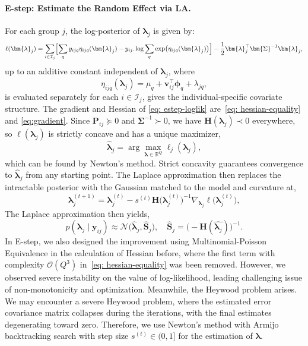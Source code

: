 \paragraph*{E-step: Estimate the Random Effect via LA.}
For each group $j$, the log-posterior of $\bm{\lambda}_{j}$ is given by:
\begin{equation}
    \ell(\bm{\lambda}_{j})=\sum_{i\in \mathcal{I}_{j}}\Bigl[\sum_{q}y_{ijq}\eta_{ijq}(\bm{\lambda}_{j})-y_{ij\cdot}\log \sum_{q}\exp\bigl(\eta_{ijq}(\bm{\lambda}_{j})\bigr)\Bigr]-\frac{1}{2}\bm{\lambda}_{j}^{\top}\bm{\Sigma}^{-1}\bm{\lambda}_{j},
    \label{eq: estep-loglik}
\end{equation}
up to an additive constant independent of $\bm{\lambda}_{j}$, where 
\begin{equation}
    \eta_{ijq}(\bm{\lambda}_{j})=\mu_{q}+\bm{v}_{ij}^{\top}\bm{\phi}_{q}+\lambda_{jq},
    \label{eq: individualcovariate}
\end{equation}
is evaluated separately for each $i\in \mathcal{I}_{j}$, gives the individual-specific covariate structure.
The gradient and Hessian of \eqref{eq: estep-loglik} are~\eqref{eq: hessian-equality} and \eqref{eq:gradient}. Since $\mathbf{P}_{ij}\succeq 0$ and $\bm{\Sigma}^{-1}\succ 0$, we have $\mathbf{H}(\bm{\lambda}_{j})\prec 0$ everywhere, so $\ell(\bm{\lambda}_{j})$ is strictly concave and has a unique maximizer,
\begin{equation}
     \hat{\bm{\lambda}}_{j}
     = \arg\max_{\bm{\lambda}\in \mathbb{R}^{Q}}
     \ell_{j}(\bm{\lambda}_{j}),
     \label{eq:maximizer}
\end{equation}
which can be found by Newton's method. Strict concavity guarantees convergence to $\hat{\bm{\lambda}}_{j}$ from any starting point. The Laplace approximation then replaces the intractable posterior with the Gaussian matched to the model and curvature at,
\begin{equation}
    \bm{\lambda}_{j}^{(t+1)}=
    \bm{\lambda}_{j}^{(t)}
    -s^{(t)}\mathbf{H}\bigl(\bm{\lambda}_{j}^{(t)}
    \bigr)^{-1}\nabla_{\bm{\lambda}_{j}}
    \ell \bigl(\bm{\lambda}_{j}^{(t)}\bigr),
    \label{eq:newton-method}
\end{equation}
The Laplace approximation then yields,
\begin{equation}
    p(\bm{\lambda}_{j}\mid \bm{y}_{ij}) \approx \mathcal{N}\bigl(\hat{\bm{\lambda}}_{j}, \hat{\mathbf{S}}_{j}\bigr), \quad \hat{\mathbf{S}}_{j}=\bigl(-\mathbf{H}(\hat{\bm{\lambda}_{j}})\bigr)^{-1}.
    \label{eq:surrogate-eq}
\end{equation}
In E-step, we also designed the improvement using Multinomial-Poisson Equivalence in the calculation of Hessian before, where the first term with complexity $\mathcal{O}\left(Q^{3}\right)$ in~\ref{eq: hessian-equality} was been removed. However, we observed severe instability on the value of log-likelihood, leading challenging issue of non-monotonicity and optimization. Meanwhile, the Heywood problem arises. We may encounter a severe Heywood problem, where the estimated error covariance matrix collapses during the iterations, with the final estimates degenerating toward zero. Therefore, we use Newton's method with Armijo backtracking search with step size $s^{(t)}\in (0,1]$ for the estimation of $\bm{\lambda}$. 

